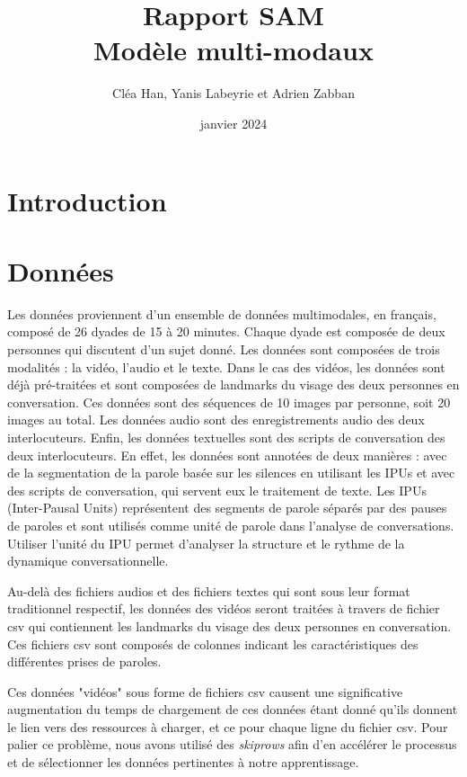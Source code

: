 \documentclass[a4paper]{article}
\title{Rapport SAM \\ Modèle multi-modaux}
\author{Cléa Han, Yanis Labeyrie et Adrien Zabban}
\date{janvier 2024}
\begin{document}
\maketitle

\section{Introduction}

\section{Données}

Les données proviennent d'un ensemble de données multimodales, en français, composé de 26 dyades de 15 à 20 minutes.
Chaque dyade est composée de deux personnes qui discutent d'un sujet donné. Les données sont composées de trois modalités : la vidéo, l'audio et le texte.
Dans le cas des vidéos, les données sont déjà pré-traitées et sont composées de landmarks du visage des deux personnes en conversation. Ces données sont des séquences de 10 images par personne, soit 20 images au total. Les données audio sont des enregistrements audio des deux interlocuteurs. Enfin, les données textuelles sont des scripts de conversation des deux interlocuteurs.
En effet, les données sont annotées de deux manières : avec de la segmentation de la parole basée sur les silences en utilisant les IPUs et avec des scripts de conversation, qui servent eux le traitement de texte. 
Les IPUs (Inter-Pausal Units) représentent des segments de parole séparés par des pauses de paroles et sont utilisés comme unité de parole dans l'analyse de conversations.
Utiliser l'unité du IPU permet d'analyser la structure et le rythme de la dynamique conversationnelle. 

Au-delà des fichiers audios et des fichiers textes qui sont sous leur format traditionnel respectif, 
les données des vidéos seront traitées à travers de fichier csv qui contiennent les landmarks du visage des deux personnes en conversation. Ces fichiers csv sont composés de colonnes indicant les caractéristiques des différentes prises de paroles. 

Ces données "vidéos" sous forme de fichiers csv causent une significative augmentation du temps de chargement de ces données étant donné qu'ils donnent le lien vers des ressources à charger, et ce pour chaque ligne du fichier csv. 
Pour palier ce problème, nous avons utilisé des \textit{skiprows} afin d'en accélérer le processus et de sélectionner les données pertinentes à notre apprentissage.
\end{document}
